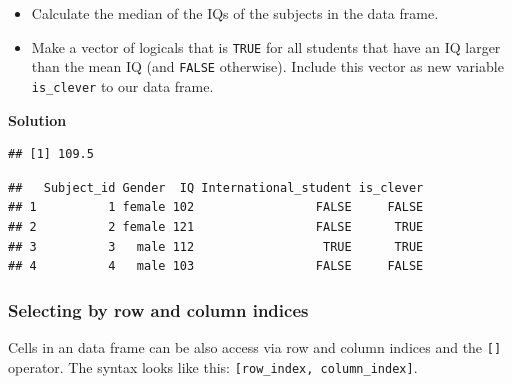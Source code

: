 \documentclass[
]{scrartcl}
\makeatletter
\newenvironment{Shaded}{\begin{snugshade}}{\end{snugshade}}
\newcommand{\FunctionTok}[1]{\textcolor[rgb]{0.13,0.29,0.53}{\textbf{#1}}}
\newcommand{\NormalTok}[1]{#1}
\newcommand{\OtherTok}[1]{\textcolor[rgb]{0.56,0.35,0.01}{#1}}
\newcommand{\SpecialCharTok}[1]{\textcolor[rgb]{0.81,0.36,0.00}{\textbf{#1}}}
\providecommand{\tightlist}{%
  \setlength{\itemsep}{0pt}\setlength{\parskip}{0pt}}
\newenvironment{kframe}{%
\medskip{}
\setlength{\fboxsep}{.8em}
 \def\at@end@of@kframe{}%
 \ifinner\ifhmode%
  \def\at@end@of@kframe{\end{minipage}}%
  \begin{minipage}{\columnwidth}%
 \fi\fi%
 \def\FrameCommand##1{\hskip\@totalleftmargin \hskip-\fboxsep
 \colorbox{shadecolor}{##1}\hskip-\fboxsep
     \hskip-\linewidth \hskip-\@totalleftmargin \hskip\columnwidth}%
 \MakeFramed {\advance\hsize-\width
   \@totalleftmargin\z@ \linewidth\hsize
   \@setminipage}}%
 {\par\unskip\endMakeFramed%
 \at@end@of@kframe}
\newenvironment{rmdblock}[1]
  {
  \begin{itemize}
  \renewcommand{\labelitemi}{
    \raisebox{-.7\height}[0pt][0pt]{
      {\setkeys{Gin}{width=3em,keepaspectratio}\texttt{[image: images/\#1]}}
    }
  }
  \setlength{\fboxsep}{1em}
  \begin{kframe}
  \item
  }
  {
  \end{kframe}
  \end{itemize}
  }
\newenvironment{myexercise}
    {\begin{rmdblock}{exercise_green}}
    {\end{rmdblock}}
\newenvironment{webexsolution}[1]
    {\par\tiny\textbf{#1}}
    {\par}
\newcommand{\webexhide}[1]{\begin{webexsolution}{#1}}
\newcommand{\webexunhide}{\end{webexsolution}}
\makeatother
\begin{document}
\begin{myexercise}
\begin{itemize}
\tightlist
\item
  Calculate the median of the IQs of the subjects in the data frame.
\item
  Make a vector of logicals that is \texttt{TRUE} for all students that
  have an IQ larger than the mean IQ (and \texttt{FALSE} otherwise).
  Include this vector as new variable \texttt{is\_clever} to our data
  frame.
\end{itemize}
\end{myexercise}
\webexhide{Solution}

\begin{Shaded}
\end{Shaded}

\begin{verbatim}
## [1] 109.5
\end{verbatim}

\begin{Shaded}
\end{Shaded}

\begin{verbatim}
##   Subject_id Gender  IQ International_student is_clever
## 1          1 female 102                 FALSE     FALSE
## 2          2 female 121                 FALSE      TRUE
## 3          3   male 112                  TRUE      TRUE
## 4          4   male 103                 FALSE     FALSE
\end{verbatim}

\webexunhide

\hypertarget{selecting-by-row-and-column-indices}{%
\subsubsection{Selecting by row and column indices}\label{selecting-by-row-and-column-indices}}

Cells in an data frame can be also access via row and column indices and the \texttt{{[}{]}} operator. The syntax looks like this: \texttt{{[}row\_index,\ column\_index{]}}.
\end{document}
